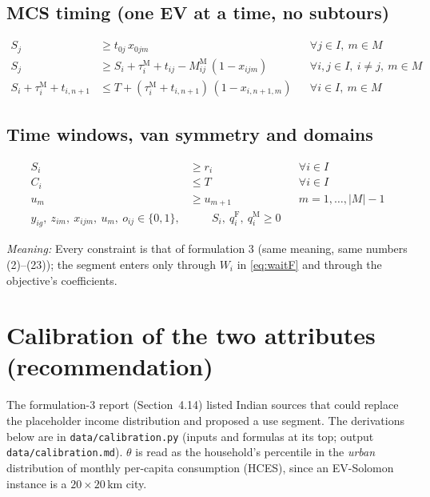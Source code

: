 \documentclass[12pt,a4paper]{article}
\newcommand{\mdesc}[1]{\par{\textit{Meaning:} #1}\par}
\begin{document}
\subsection{MCS timing (one EV at a time, no subtours)}
\begin{align}
S_j &\ge t_{0j}\,x_{0jm} && \forall j\in I,\ m\in M \label{eq:depart}\\
S_j &\ge S_i+\tau^{\mathrm M}_i+t_{ij}-M^{\mathrm M}_{ij}\,(1-x_{ijm}) && \forall i,j\in I,\ i\ne j,\ m\in M \label{eq:seq}\\
S_i+\tau^{\mathrm M}_i+t_{i,n+1} &\le T+(\tau^{\mathrm M}_i+t_{i,n+1})\,(1-x_{i,n+1,m}) && \forall i\in I,\ m\in M \label{eq:return}
\end{align}

\subsection{Time windows, van symmetry and domains}
\begin{align}
S_i &\ge r_i && \forall i\in I \label{eq:release}\\
C_i &\le T && \forall i\in I \label{eq:horizon}\\
u_m &\ge u_{m+1} && m=1,\dots,|M|-1 \label{eq:vansym}\\
y_{ig},\ z_{im},\ x_{ijm},\ u_m,\ o_{ij}\in\{0,1\}, & \qquad S_i,\ q^{\mathrm F}_i,\ q^{\mathrm M}_i\ge0 \label{eq:dom}
\end{align}
\mdesc{Every constraint is that of formulation 3 (same meaning, same numbers (2)--(23)); the segment enters only through $W_i$ in \eqref{eq:waitF} and through the objective's coefficients.}

\section{Calibration of the two attributes (recommendation)}
\label{sec:calib}

The formulation-3 report (Section~4.14) listed Indian sources that could replace the placeholder income distribution and proposed a use segment. The derivations below are in \texttt{data/calibration.py} (inputs and formulas at its top; output \texttt{data/calibration.md}). $\theta$ is read as the household's percentile in the \emph{urban} distribution of monthly per-capita consumption (HCES), since an EV-Solomon instance is a $20\times20$\,km city.
\end{document}
